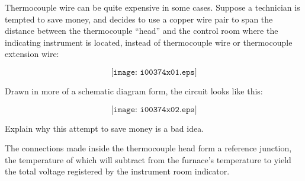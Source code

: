 

Thermocouple wire can be quite expensive in some cases.  Suppose a technician is tempted to save money, and decides to use a copper wire pair to span the distance between the thermocouple ``head'' and the control room where the indicating instrument is located, instead of thermocouple wire or thermocouple extension wire:

$$\texttt{[image: i00374x01.eps]}$$

Drawn in more of a schematic diagram form, the circuit looks like this:

$$\texttt{[image: i00374x02.eps]}$$

Explain why this attempt to save money is a bad idea.







The connections made inside the thermocouple head form a reference junction, the temperature of which will subtract from the furnace's temperature to yield the total voltage registered by the instrument room indicator.











